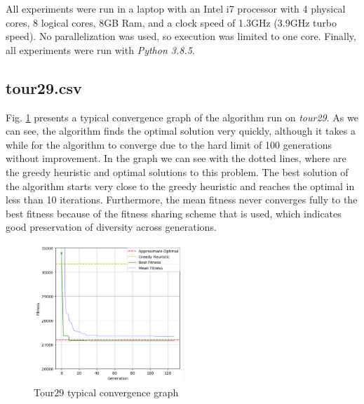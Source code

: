 \documentclass[a4paper,10pt]{article}
\newcommand{\ReplaceMe}[1]{{\color{blue}#1}}
\begin{document}
All experiments were run in a laptop with an Intel i7 processor with 4 physical cores, 8 logical cores, 8GB Ram, and a clock speed of 1.3GHz (3.9GHz turbo speed). No parallelization was used, so execution was limited to one core. Finally, all experiments were run with \textit{Python 3.8.5}.

\subsection{tour29.csv} \label{ss:tour29}





Fig. \ref{fig:tour29convergence} presents a typical convergence graph of the algorithm run on \textit{tour29}. As we can see, the algorithm finds the optimal solution very quickly, although it takes a while for the algorithm to converge due to the hard limit of 100 generations without improvement. In the graph we can see with the dotted lines, where are the greedy heuristic and optimal solutions to this problem. The best solution of the algorithm starts very close to the greedy heuristic and reaches the optimal in less than 10 iterations. Furthermore, the mean fitness never converges fully to the best fitness because of the fitness sharing scheme that is used, which indicates good preservation of diversity across generations.

\begin{figure}[H]
    \centering
	\includegraphics[width=0.5\textwidth]{results/4.2/tour29_convergence.png}
    \caption{Tour29 typical convergence graph}
    \label{fig:tour29convergence}
\end{figure}
\end{document}
